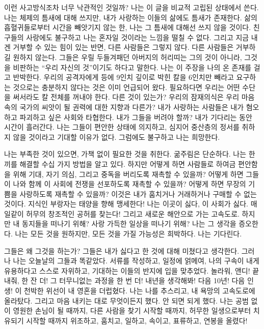 \documentclass[10pt, b6paper, openany]{memoir}
\begin{document}
\begin{article}
이런 사고방식조차 너무 낙관적인 것일까? 나는 이 글을 비교적 고립된 상태에서 쓴다. 나는 체제의 틈새에 대해 쓰지만, 내가 사랑하는 이들의 삶에도 틈새가 존재한다. 삶의 흡혈귀들로부터 시간을 빼앗기지 않는 한, 나는 그 틈새에 대해선 쓰지 않을 것이다. 친구들의 사랑에도 불구하고 나는 혼자일 것이라는 느낌을 떨칠 수 없다. 그리고 지금 내겐 거부할 수 있는 힘이 있는 반면, 다른 사람들은 그렇지 않다. 다른 사람들은 거부하길 원하지 않는다. 그들은 우릴 두들겨패던 아버지의 허리띠는 그의 것이 아니라, 그것을 비판하는 ``우리 자신의 것''이기도 하다고 말한다. 나는 이 주장을 나의 온 존재를 걸고 반박한다. 우리의 공격자에게 등에 9인치 깊이로 박힌 칼을 6인치만 빼라고 요구하는 것으로는 충분하지 않다는 것은 이미 언급되어 왔다. 필요하다면 우리는 어떤 수단을 써서라도 칼 전체를 꺼내야 한다. 다른 것이 있는가? 우리의 잠재의식은 우리 마음 속의 국가의 씨앗이 될 권력에 대한 지향과 다른가? 내가 사랑하는 사람들은 내가 혐오하고 파괴하고 싶은 사회와 타협한다. 내가 그들을 버려야 할까? 내가 기다리는 동안 시간이 흘러간다. 나는 그들이 편안한 상태에 의지하고, 심지어 중산층의 정서를 취하지 않을 것이라고 기대할 이유가 없다. 그럼에도 불구하고 나는 희망한다. 

나는 부족한 것이 있으면, 가책 없이 필요한 것을 취한다. 굶주림은 단순하다. 나는 한 끼를 해결할 수십 가지 방법을 알고 있다. 하지만 어떻게 하면 사람들로 하여금 편안함을 위해 기대, 자기 의심, 그리고 중독을 버리도록 재촉할 수 있을까? 어떻게 하면 그들이 나와 함께 이 사회에 전쟁을 선포하도록 재촉할 수 있을까? 어떻게 하면 무장의 기쁨을 사랑하도록 재촉할 수 있을까? 이것은 내가 훔치거나 거래하거나 구매할 수 없는 것이다. 지식인 부랑자는 태양을 향해 맹세한다! 나는 이곳이 싫다, 이 사회가 싫다. 매일같이 허무의 창조적인 공허를 찾는다! 그리고 새로운 해안으로 가는 고속도로. 하지만 내 동지들을 떠나기 위해? 사랑 가득한 일상을 떠나기 위해? 나는 그 생각을 증오한다. 나는 모든 것을 원하지만, 모든 것을 가질 가능성은 희박하다. 나는 기다린다.

그들은 왜 그것을 하는가? 그들은 내가 싫다고 한 것에 대해 미쳤다고 생각한다. 그러나 나는 오늘날의 그들과 똑같았다. 서류를 작성하고, 일정에 얽메여, 나의 구속이 내게 유용하다고 스스로 자위하고, 기대하는 이들의 반지에 입을 맞추었다. 놀라워, 앤디! 끝내줘, 한 잔 더! 그 터무니없는 과정을 한 번 더! 내년을 생각해봐! 다음 10년! 다음 인생! 이 천박한 위선이 내 영혼을 더럽혔다. 나는 나를 추스리고, 내 욕망의 고속도로에 올라탔다. 그리고 마음 내키는 대로 무엇이든지 했다. 안 되면 되게 했다. 나는 공범 없이 영원한 손님이 될 때까지, 다른 사람을 찾기 시작할 때까지, 허무한 일생으로부터 치유되기 시작할 때까지 위조하고, 훔치고, 일하고, 속이고, 표류하고, 연봉을 올렸다! 


\end{article}
\end{document}
